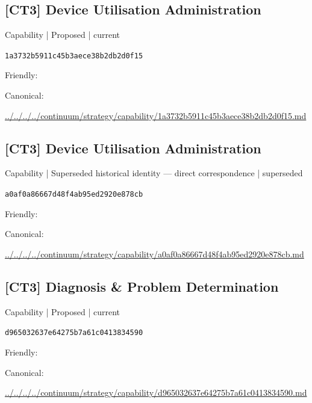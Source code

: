 \documentclass[10pt,a4paper]{article}
\begin{document}
\subsection*{[CT3] Device Utilisation Administration}
{\small Capability | Proposed | current}\par
\texttt{1a3732b5911c45b3aece38b2db2d0f15}\par
Friendly: \par
Canonical: \par
{\footnotesize\url{../../../../continuum/strategy/capability/1a3732b5911c45b3aece38b2db2d0f15.md}}\par
\subsection*{[CT3] Device Utilisation Administration}
{\small Capability | Superseded historical identity — direct correspondence | superseded}\par
\texttt{a0af0a86667d48f4ab95ed2920e878cb}\par
Friendly: \par
Canonical: \par
{\footnotesize\url{../../../../continuum/strategy/capability/a0af0a86667d48f4ab95ed2920e878cb.md}}\par
\subsection*{[CT3] Diagnosis \& Problem Determination}
{\small Capability | Proposed | current}\par
\texttt{d965032637e64275b7a61c0413834590}\par
Friendly: \par
Canonical: \par
{\footnotesize\url{../../../../continuum/strategy/capability/d965032637e64275b7a61c0413834590.md}}\par
\end{document}
